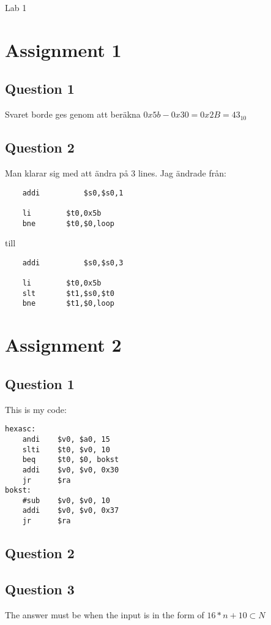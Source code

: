 \documentclass[a4paper,11p]{article}
\begin{document}
\begin{center}
Lab 1
\end{center}
\section{Assignment 1}
\subsection{Question 1}
Svaret borde ges genom att beräkna $0x5b - 0x30 = 0x2B = 43_{10}$
\subsection{Question 2}
Man klarar sig med att ändra på 3 lines. Jag ändrade från:
\begin{verbatim}
    addi	      $s0,$s0,1	
	
    li        $t0,0x5b
    bne       $t0,$0,loop
\end{verbatim}
till
\begin{verbatim}
    addi	      $s0,$s0,3	
	
    li        $t0,0x5b
    slt       $t1,$s0,$t0
    bne       $t1,$0,loop
\end{verbatim}
\section{Assignment 2}
\subsection{Question 1}
This is my code:
\begin{verbatim}
hexasc: 
    andi    $v0, $a0, 15
    slti    $t0, $v0, 10
    beq     $t0, $0, bokst
    addi    $v0, $v0, 0x30
    jr      $ra
bokst:	
    #sub    $v0, $v0, 10
    addi    $v0, $v0, 0x37
    jr      $ra	
\end{verbatim}
\subsection{Question 2}
\subsection{Question 3}
The answer must be when the input is in the form of $16*n + 10 \subset N$
\end{document}
